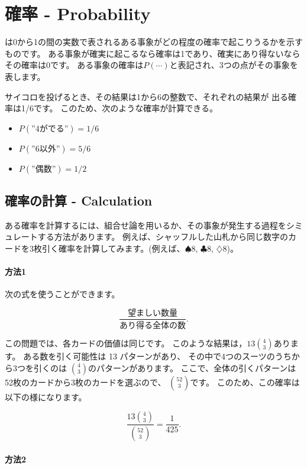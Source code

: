 \chapter{確率 - Probability}


は0から1の間の実数で表されるある事象がどの程度の確率で起こりうるかを示すものです。
ある事象が確実に起こるなら確率は1であり、確実にあり得ないならその確率は0です。
ある事象の確率は$P(\cdots)$と表記され、3つの点がその事象を表します。

サイコロを投げるとき、その結果は1から6の整数で、それぞれの結果が 出る確率は1/6です。
このため、次のような確率が計算できる。

\begin{itemize}[noitemsep]
\item $P(\textrm{''4がでる''})=1/6$
\item $P(\textrm{''6以外''})=5/6$
\item $P(\textrm{''偶数''})=1/2$
\end{itemize}

\section{確率の計算 - Calculation}


ある確率を計算するには、組合せ論を用いるか、その事象が発生する過程をシミュレートする方法があります。
例えば、シャッフルした山札から同じ数字のカードを3枚引く確率を計算してみます。(例えば、$\spadesuit 8$, $\clubsuit 8$, $\diamondsuit 8$)。

\subsubsection*{方法1}

次の式を使うことができます。

\[\frac{\textrm{望ましい数量}}{\textrm{あり得る全体の数}}.\]

この問題では、各カードの価値は同じです。
このような結果は，$13 {4 \choose 3}$あります。
ある数を引く可能性は 13 パターンがあり、
その中で4つのスーツのうちから3つを引くのは
${4 \choose 3}$のパターンがあります。
ここで、全体の引くパターンは52枚のカードから3枚のカードを選ぶので、
${52 \choose 3}$です。
このため、この確率は以下の様になります。

\[\frac{13 {4 \choose 3}}{{52 \choose 3}} = \frac{1}{425}.\]

\subsubsection*{方法2}

